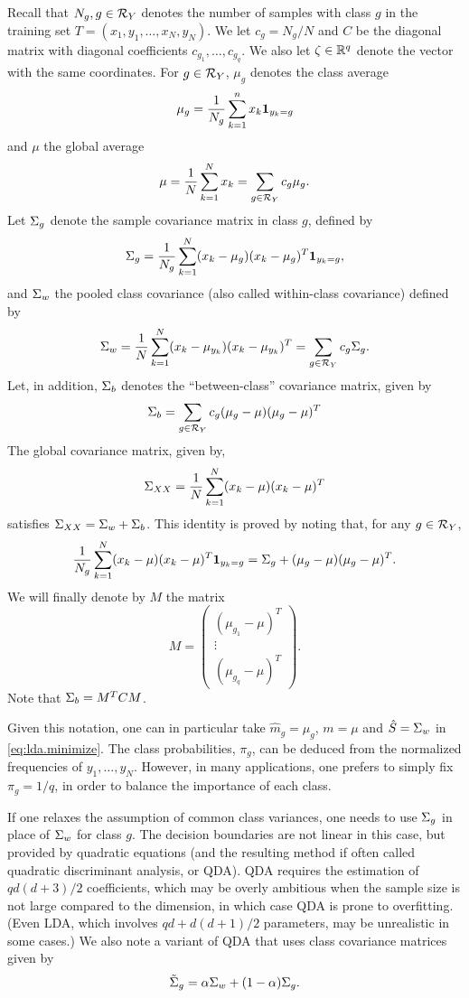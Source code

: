 Recall that $N_g, g\in {\mathcal R}_Y$ denotes the number of samples with class $g$ in the training set $T = (x_1, y_1, \ldots, x_N, y_N)$. We  let $c_g = N_g/N$ and $C$ be the diagonal matrix with diagonal coefficients $c_{g_1}, \ldots, c_{g_q}$. We  also let $\zeta \in {\mathbb{R}}^q$  denote the vector with the same coordinates. For $g\in {\mathcal R}_Y$, $\mu_g$ denotes the class average 
\[
\mu_g = \frac1{N_g} \sum_{k=1}^n x_k {\bm 1}_{y_k = g}
\]
and $\mu$ the global average
\[
\mu = \frac1N \sum_{k=1}^N x_k = \sum_{g\in {\mathcal R}_Y} c_g\mu_g.
\]
Let $\Sigma_{g}$ denote the sample covariance matrix in class $g$, defined by
\[
\Sigma_g = \frac1{N_g} \sum_{k=1}^N (x_k-\mu_g)(x_k-\mu_g)^T {\bm 1}_{y_k = g},
\]
and $\Sigma_w$ the pooled class covariance (also called \alert{within-class} covariance) defined by
\[
\Sigma_w = \frac{1}{N} \sum_{k=1}^N (x_k - \mu_{y_k})(x_k - \mu_{y_k})^T = \sum_{g\in {\mathcal R}_Y} c_g \Sigma_g.
\]
Let, in addition, $\Sigma_b$ denotes the ``between-class'' covariance matrix, given by
\[
\Sigma_b = \sum_{g\in{\mathcal R}_Y} c_g (\mu_g- \mu)(\mu_g- \mu)^T
\]
The global covariance matrix, given by, 
\[
\Sigma_{XX} = \frac1N \sum_{k=1}^N (x_k-\mu)(x_k-\mu)^T
\]
satisfies $\Sigma_{XX} = \Sigma_w + \Sigma_b$. This identity is proved by noting that, for any $g\in{\mathcal R}_Y$,
\[
\frac{1}{N_g} \sum_{k=1}^N (x_k- \mu)(x_k- \mu)^T {\bm 1}_{y_k = g} = \Sigma_g + (\mu_g- \mu)(\mu_g- \mu)^T.
\]
We will finally denote by $M$ the matrix
\[
M = \begin{pmatrix} (\mu_{g_1}- \mu)^T\\ \vdots\\ (\mu_{g_q}- \mu)^T\end{pmatrix}.
\]
Note that $\Sigma_b = M^T C M$.

Given this notation, one can in particular take $\hat m_g = \mu_g$, $m = \mu$ and $\hat S = \Sigma_w$ in \cref{eq:lda.minimize}. The class probabilities, $\pi_g$, can be deduced from the normalized frequencies of $y_1, \ldots, y_N$. However, in many applications, one prefers to simply fix $\pi_g=1/q$, in order to balance the importance of each class.

\begin{remark}
If one relaxes the assumption of common class variances, one needs  to use $\Sigma_g$ in place of $\Sigma_w$ for class $g$. The decision boundaries are not linear in this case, but provided by quadratic equations (and the resulting method if often called quadratic discriminant analysis, or QDA). QDA requires the estimation of $qd(d+3)/2$ coefficients, which may be overly ambitious when the sample size is not large compared to the dimension, in which case QDA is prone to overfitting. (Even LDA, which  involves  $qd + d(d+1)/2$ parameters, may be unrealistic in some cases.) We also note 
a variant of QDA that uses  class covariance
matrices given by
$$
\tilde {\Sigma}_g = \alpha \Sigma_w + (1-\alpha)\Sigma_g.
$$
\end{remark}

